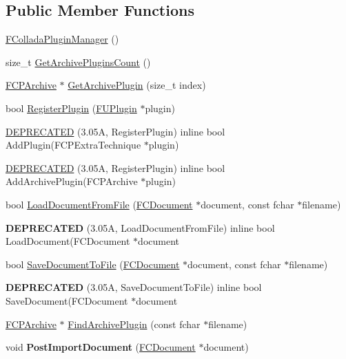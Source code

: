 \subsection*{Public Member Functions}
\begin{DoxyCompactItemize}
\item 
\hyperlink{classFColladaPluginManager_affbab236883a435d8bb08bc52edca2ca}{FColladaPluginManager} ()
\item 
size\_\-t \hyperlink{classFColladaPluginManager_a2a0ebfa39ce05b91de49c348a6c5c568}{GetArchivePluginsCount} ()
\item 
\hyperlink{classFCPArchive}{FCPArchive} $\ast$ \hyperlink{classFColladaPluginManager_a7137a9d679ac626669fac19e73beb691}{GetArchivePlugin} (size\_\-t index)
\item 
bool \hyperlink{classFColladaPluginManager_a52fc25de16489fadec449415a0f2c633}{RegisterPlugin} (\hyperlink{classFUPlugin}{FUPlugin} $\ast$plugin)
\item 
\hyperlink{classFColladaPluginManager_a1160a19c60e7ec7f72759553929454d4}{DEPRECATED} (3.05A, RegisterPlugin) inline bool AddPlugin(FCPExtraTechnique $\ast$plugin)
\item 
\hyperlink{classFColladaPluginManager_abfd48890f1e1255f68dd6a7d07b5d980}{DEPRECATED} (3.05A, RegisterPlugin) inline bool AddArchivePlugin(FCPArchive $\ast$plugin)
\item 
bool \hyperlink{classFColladaPluginManager_a15089895620feae23927be8bc8c60c1d}{LoadDocumentFromFile} (\hyperlink{classFCDocument}{FCDocument} $\ast$document, const fchar $\ast$filename)
\item 
\hypertarget{classFColladaPluginManager_af245b43727fddb1dd3ae4b331afb17d2}{
{\bfseries DEPRECATED} (3.05A, LoadDocumentFromFile) inline bool LoadDocument(FCDocument $\ast$document}
\label{classFColladaPluginManager_af245b43727fddb1dd3ae4b331afb17d2}

\item 
bool \hyperlink{classFColladaPluginManager_ab9deb7df7ff61ec0cb82efb37c5bcc0b}{SaveDocumentToFile} (\hyperlink{classFCDocument}{FCDocument} $\ast$document, const fchar $\ast$filename)
\item 
\hypertarget{classFColladaPluginManager_a03d0fd439d210cd76c6663f4e89d9825}{
{\bfseries DEPRECATED} (3.05A, SaveDocumentToFile) inline bool SaveDocument(FCDocument $\ast$document}
\label{classFColladaPluginManager_a03d0fd439d210cd76c6663f4e89d9825}

\item 
\hyperlink{classFCPArchive}{FCPArchive} $\ast$ \hyperlink{classFColladaPluginManager_ac366a235e5a2704313bc1d7eccb73df0}{FindArchivePlugin} (const fchar $\ast$filename)
\item 
\hypertarget{classFColladaPluginManager_a4e72b0a129057dd3f5708d47dbb4f189}{
void {\bfseries PostImportDocument} (\hyperlink{classFCDocument}{FCDocument} $\ast$document)}
\label{classFColladaPluginManager_a4e72b0a129057dd3f5708d47dbb4f189}


\end{DoxyCompactItemize}
